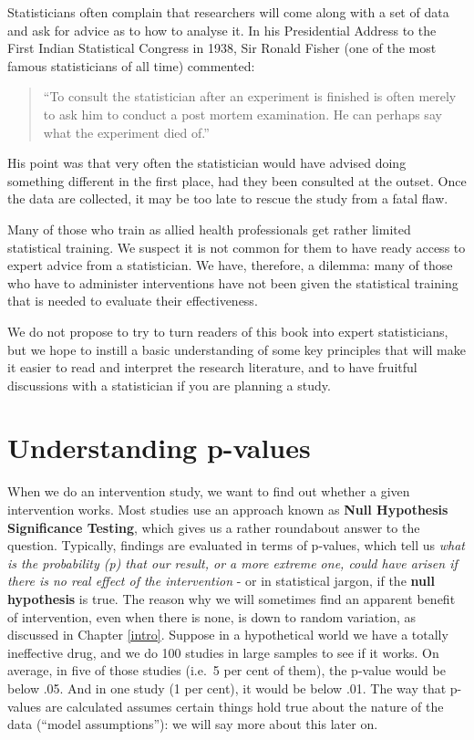 \documentclass{krantz}
\begin{document}
Statisticians often complain that researchers will come along with a set of data and ask for advice as to how to analyse it. In his Presidential Address to the First Indian Statistical Congress in 1938, Sir Ronald Fisher (one of the most famous statisticians of all time) commented:

\begin{quote}
``To consult the statistician after an experiment is finished is often merely to ask him to conduct a post mortem examination. He can perhaps say what the experiment died of.''
\end{quote}

His point was that very often the statistician would have advised doing something different in the first place, had they been consulted at the outset. Once the data are collected, it may be too late to rescue the study from a fatal flaw.

Many of those who train as allied health professionals get rather limited statistical training. We suspect it is not common for them to have ready access to expert advice from a statistician. We have, therefore, a dilemma: many of those who have to administer interventions have not been given the statistical training that is needed to evaluate their effectiveness.

We do not propose to try to turn readers of this book into expert statisticians, but we hope to instill a basic understanding of some key principles that will make it easier to read and interpret the research literature, and to have fruitful discussions with a statistician if you are planning a study.

\hypertarget{understanding-p-values}{%
\section{Understanding p-values}\label{understanding-p-values}}

When we do an intervention study, we want to find out whether a given intervention works. Most studies use an approach known as \textbf{Null Hypothesis Significance Testing}, which gives us a rather roundabout answer to the question. Typically, findings are evaluated in terms of p-values, which tell us \emph{what is the probability (p) that our result, or a more extreme one, could have arisen if there is no real effect of the intervention} - or in statistical jargon, if the \textbf{null hypothesis} is true. The reason why we will sometimes find an apparent benefit of intervention, even when there is none, is down to random variation, as discussed in Chapter \ref{intro}. Suppose in a hypothetical world we have a totally ineffective drug, and we do 100 studies in large samples to see if it works. On average, in five of those studies (i.e.~5 per cent of them), the p-value would be below .05. And in one study (1 per cent), it would be below .01. The way that p-values are calculated assumes certain things hold true about the nature of the data (``model assumptions''): we will say more about this later on.
\end{document}
